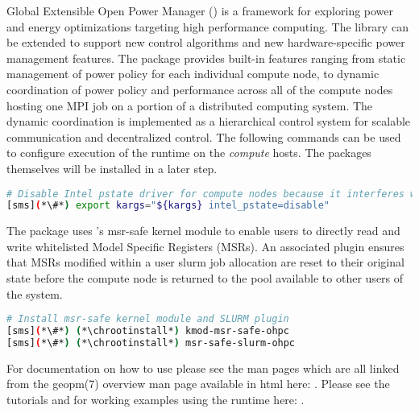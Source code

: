 Global Extensible Open Power Manager (\GEOPM{}) is a framework for exploring
power and energy optimizations targeting high performance computing.  The
library can be extended to support new control algorithms and new
hardware-specific power management features.  The \GEOPM{} package provides
built-in features ranging from static management of power policy for each
individual compute node, to dynamic coordination of power policy and
performance across all of the compute nodes hosting one MPI job on a portion of
a distributed computing system.  The dynamic coordination is implemented as a
hierarchical control system for scalable communication and decentralized
control. The following commands can be used to configure execution of the
\GEOPM{} runtime on the {\em compute} hosts. The packages themselves will be
installed in a later step.

\begin{lstlisting}[language=bash,keywords={},upquote=true]
# Disable Intel pstate driver for compute nodes because it interferes with GEOPM's operation.
[sms](*\#*) export kargs="${kargs} intel_pstate=disable"
\end{lstlisting}

\noindent The \GEOPM{} package uses \OHPC{}'s msr-safe kernel module
to enable users to directly read and write whitelisted Model Specific
Registers (MSRs).  An associated \SLURM{} plugin ensures that MSRs modified
within a user slurm job allocation are reset to their original state
before the compute node is returned to the pool available to other
users of the system.

\begin{lstlisting}[language=bash,keywords={},upquote=true]
# Install msr-safe kernel module and SLURM plugin
[sms](*\#*) (*\chrootinstall*) kmod-msr-safe-ohpc
[sms](*\#*) (*\chrootinstall*) msr-safe-slurm-ohpc
\end{lstlisting}

For documentation on how to use \GEOPM{} please see
the \GEOPM{} man pages which are all linked from the geopm(7) overview
man page available in html here:
\href{http://geopm.github.io/man/geopm.7.html}
{\color{blue}{http://geopm.github.io/man/geopm.7.html}}.
Please see the \GEOPM{} tutorials and for working examples using the
\GEOPM{} runtime here: \href{https://github.com/geopm/geopm/tree/dev/tutorial}
{\color{blue}{https://github.com/geopm/geopm/tree/dev/tutorial}}.
